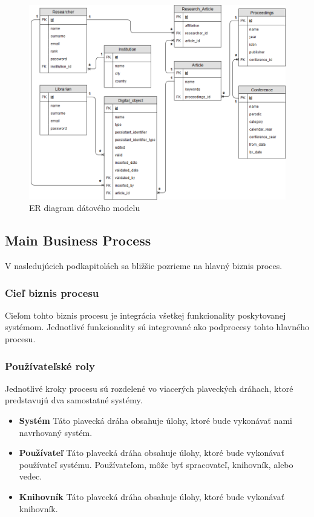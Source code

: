 \documentclass[10pt,oneside,slovak,a4paper]{article}
\begin{document}
\begin{figure} [H]
\label{datamodel}
\centering
\includegraphics[scale=0.4]{datovy_model.png} 
\caption{ER diagram dátového modelu}
\end{figure}

\subsection{Main Business Process}
V nasledujúcich podkapitolách sa bližšie pozrieme na hlavný biznis proces.

\subsubsection{Cieľ biznis procesu}
Cieľom tohto biznis procesu je integrácia všetkej funkcionality poskytovanej systémom. Jednotlivé funkcionality sú integrované ako podprocesy tohto hlavného procesu.

\subsubsection{Používateľské roly}
Jednotlivé kroky procesu sú rozdelené vo viacerých plaveckých dráhach, ktoré predstavujú dva samostatné systémy.

\begin{itemize}
\item \textbf{Systém} Táto plavecká dráha obsahuje úlohy, ktoré bude vykonávať nami navrhovaný systém.
\item \textbf{Používateľ} Táto plavecká dráha obsahuje úlohy, ktoré bude vykonávať používateľ systému. Používateľom, môže byť spracovateľ, knihovník, alebo vedec.
\item \textbf{Knihovník} Táto plavecká dráha obsahuje úlohy, ktoré bude vykonávať knihovník.
\end{itemize}
\end{document}
